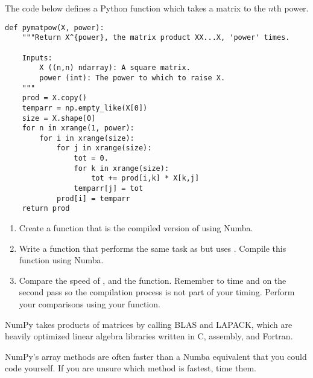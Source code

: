 \begin{problem}
The code below defines a Python function which takes a matrix to the $n$th power.

\begin{lstlisting}
def pymatpow(X, power):
    """Return X^{power}, the matrix product XX...X, 'power' times.

    Inputs:
        X ((n,n) ndarray): A square matrix.
        power (int): The power to which to raise X.
    """
    prod = X.copy()
    temparr = np.empty_like(X[0])
    size = X.shape[0]
    for n in xrange(1, power):
        for i in xrange(size):
            for j in xrange(size):
                tot = 0.
                for k in xrange(size):
                    tot += prod[i,k] * X[k,j]
                temparr[j] = tot
            prod[i] = temparr
    return prod
\end{lstlisting}

\begin{enumerate}
\item Create a function  that is the compiled version of  using Numba.

\item Write a function  that performs the same task as  but uses .
Compile this function using Numba.

\item Compare the speed of ,   and the  function.
Remember to time  and  on the second pass so the compilation process is not part of your timing.
Perform your comparisons using your  function.
\end{enumerate}

NumPy takes products of matrices by calling BLAS and LAPACK, which are heavily optimized linear algebra libraries written in C, assembly, and Fortran.
\end{problem}

\begin{warn}
NumPy's array methods are often faster than a Numba equivalent that you could code yourself.
If you are unsure which method is fastest, time them.
\end{warn}

